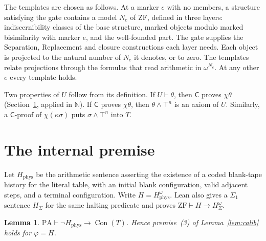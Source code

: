 \documentclass[11pt,letterpaper]{article}
\newtheorem{lemma}[theorem]{Lemma}
\newcommand{\ZF}{\mathrm{ZF}}
\newcommand{\PA}{\mathrm{PA}}
\newcommand{\N}{\mathbb{N}}
\newcommand{\Con}{\operatorname{Con}}
\newcommand{\Cc}{\mathsf{C}}
\begin{document}
The templates are chosen as follows. At a marker $e$ with no members, a
structure satisfying the gate contains a model $N_e$ of $\ZF$, defined in
three layers: indiscernibility classes of the base structure, marked
objects modulo marked bisimilarity with marker $e$, and the well-founded
part. The gate supplies the Separation, Replacement and closure
constructions each layer needs. Each object is projected to the natural number of $N_e$
it denotes, or to zero. The templates relate projections through the
formulas that read arithmetic in $\omega^{N_e}$. At any other $e$ every
template holds.

Two properties of $U$ follow from its definition. If $U\vdash\theta$, then
$\Cc$ proves $\chi\theta$ (Section~\ref{sec:internal}, applied in $\N$).
If $\Cc$ proves $\chi\theta$, then $\theta\wedge\top^n$ is an axiom of $U$.
Similarly, a $\Cc$-proof of $\chi(\kappa\sigma)$ puts $\sigma\wedge\top^n$
into $T$.

\section{The internal premise}\label{sec:internal}

Let $H_{\mathrm{phys}}$ be the arithmetic sentence asserting the existence
of a coded blank-tape history for the literal table, with an initial blank
configuration, valid adjacent steps, and a terminal configuration. Write
$H=H_{\mathrm{phys}}^\omega$. Lean also gives a $\Sigma_1$ sentence
$H_\Sigma$ for the same halting predicate and proves
$\ZF\vdash H\to H_\Sigma^\omega$.

\begin{lemma}\label{lem:internal}
$\PA\vdash\neg H_{\mathrm{phys}}\to\Con(T)$. Hence premise~(3) of
Lemma~\ref{lem:calib} holds
for $\varphi=H$.
\end{lemma}
\end{document}
